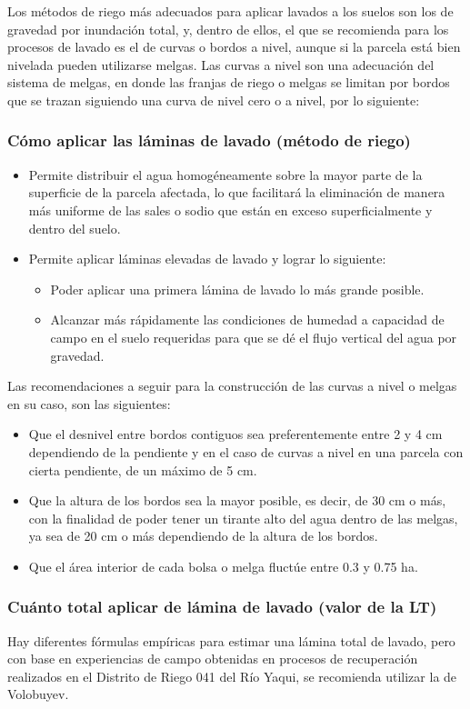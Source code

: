 Los métodos de riego más adecuados para aplicar lavados a los suelos son los de
gravedad por inundación total, y, dentro de ellos, el que se recomienda para los
procesos de lavado es el de curvas o bordos a nivel, aunque si la parcela está bien
nivelada pueden utilizarse melgas.
Las curvas a nivel son una adecuación del sistema de melgas, en donde las franjas
de riego o melgas se limitan por bordos que se trazan siguiendo una curva de nivel
cero o a nivel, por lo siguiente:
\subsubsection{Cómo aplicar las láminas de lavado (método de riego)}
\begin{itemize}
    \item Permite distribuir el agua homogéneamente sobre la mayor parte de la superficie de la parcela afectada, lo que facilitará la eliminación de manera más uniforme de las sales o sodio que están en exceso superficialmente y dentro del suelo.
    \item Permite aplicar láminas elevadas de lavado y lograr lo siguiente: \begin{itemize}
        \item Poder aplicar una primera lámina de lavado lo más grande posible.
        \item Alcanzar más rápidamente las condiciones de humedad a capacidad de campo en el suelo requeridas para que se dé el flujo vertical del agua por gravedad.
    \end{itemize}
\end{itemize}
Las recomendaciones a seguir para la construcción de las curvas a nivel o melgas
en su caso, son las siguientes:
\begin{itemize}
    \item Que el desnivel entre bordos contiguos sea preferentemente entre 2 y 4 cm dependiendo de la pendiente y en el caso de curvas a nivel en una parcela con cierta pendiente, de un máximo de 5 cm.
    \item Que la altura de los bordos sea la mayor posible, es decir, de 30 cm o más, con la finalidad de poder tener un tirante alto del agua dentro de las melgas, ya sea de 20 cm o más dependiendo de la altura de los bordos.
    \item Que el área interior de cada bolsa o melga fluctúe entre 0.3 y 0.75 ha.    
\end{itemize}
\subsubsection{Cuánto total aplicar de lámina de lavado (valor de la LT)}
Hay diferentes fórmulas empíricas para estimar una lámina total de lavado, pero con base en experiencias de campo obtenidas en procesos de recuperación realizados en el Distrito de Riego 041 del Río Yaqui, se recomienda utilizar la de Volobuyev.

